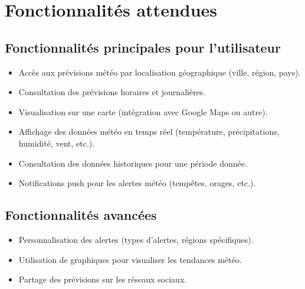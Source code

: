 \documentclass[a4paper,12pt]{article}
\begin{document}
\section{Fonctionnalités attendues}
\subsection{Fonctionnalités principales pour l'utilisateur}
\begin{itemize}
    \item Accès aux prévisions météo par localisation géographique (ville, région, pays).
    \item Consultation des prévisions horaires et journalières.
    \item Visualisation sur une carte (intégration avec Google Maps ou autre).
    \item Affichage des données météo en temps réel (température, précipitations, humidité, vent, etc.).
    \item Consultation des données historiques pour une période donnée.
    \item Notifications push pour les alertes météo (tempêtes, orages, etc.).

\end{itemize}

\subsection{Fonctionnalités avancées}
\begin{itemize}
    \item Personnalisation des alertes (types d’alertes, régions spécifiques).
    \item Utilisation de graphiques pour visualiser les tendances météo.
    \item Partage des prévisions sur les réseaux sociaux.
 

\end{itemize}
\end{document}
